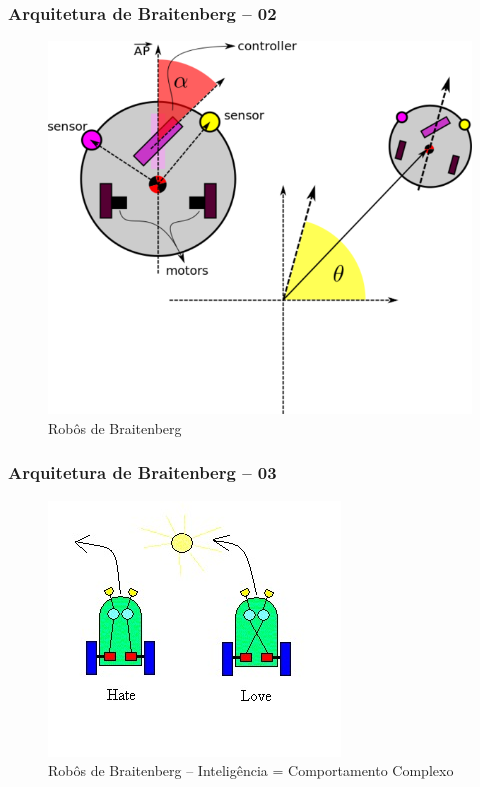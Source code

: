 \begin{frame} %

  \frametitle{Arquitetura de  Braitenberg -- 02}
        
\begin{figure}[!ht]
\centering
\includegraphics[height =.55\textheight,width=.5\textwidth]{figuras/braitember02.jpg}
\caption{Robôs de Braitenberg}
\end{figure}
    
\end{frame}

\begin{frame} %

  \frametitle{Arquitetura de  Braitenberg -- 03}
        
\begin{figure}[!ht]
\centering
\includegraphics[height =.55\textheight,width=.54\textwidth]{figuras/braitember03.jpg}
\caption{Robôs de Braitenberg -- Inteligência = Comportamento Complexo}
\end{figure}
    
\end{frame}



